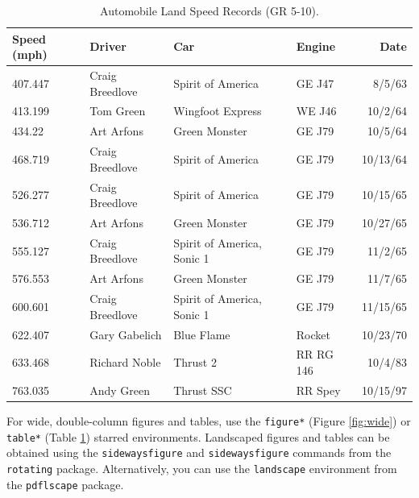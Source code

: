 \documentclass[bibtex,autowc]{apsr_submission}
\begin{document}
\begin{table}
\caption{Automobile Land Speed Records (GR 5-10).}
\label{tab:wide}

\begin{tabular}{l l l l r}
Speed (mph) & Driver          & Car                        & Engine    & Date     \\
\midrule
407.447     & Craig Breedlove & Spirit of America          & GE J47    & 8/5/63   \\
413.199     & Tom Green       & Wingfoot Express           & WE J46    & 10/2/64  \\
434.22      & Art Arfons      & Green Monster              & GE J79    & 10/5/64  \\
468.719     & Craig Breedlove & Spirit of America          & GE J79    & 10/13/64 \\
526.277     & Craig Breedlove & Spirit of America          & GE J79    & 10/15/65 \\
536.712     & Art Arfons      & Green Monster              & GE J79    & 10/27/65 \\
555.127     & Craig Breedlove & Spirit of America, Sonic 1 & GE J79    & 11/2/65  \\
576.553     & Art Arfons      & Green Monster              & GE J79    & 11/7/65  \\
600.601     & Craig Breedlove & Spirit of America, Sonic 1 & GE J79    & 11/15/65 \\
622.407     & Gary Gabelich   & Blue Flame                 & Rocket    & 10/23/70 \\
633.468     & Richard Noble   & Thrust 2                   & RR RG 146 & 10/4/83  \\
763.035     & Andy Green      & Thrust SSC                 & RR Spey   & 10/15/97\\
\end{tabular}


\end{table}

For wide, double-column figures and tables, use the \verb|figure*| (Figure \ref{fig:wide}) or \verb|table*| (Table \ref{tab:wide}) starred environments. Landscaped figures and tables can be obtained using the \texttt{sidewaysfigure} and \texttt{sidewaysfigure} commands from the \texttt{rotating} package. Alternatively, you can use the \texttt{landscape} environment from the \texttt{pdflscape} package.
\end{document}
